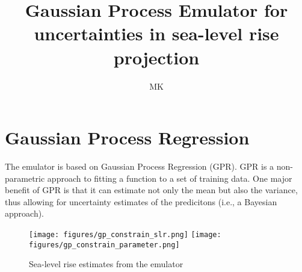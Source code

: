 \documentclass[12pt,a4paper]{article}
\author{MK}
\title{Gaussian Process Emulator for uncertainties in sea-level rise projection}
\begin{document}
\maketitle

\section{Gaussian Process Regression}

The emulator is based on Gaussian Process Regression (GPR).
GPR is a non-parametric approach to fitting a function to a set of training data.
One major benefit of GPR is that it can estimate not only the mean but also the variance, thus allowing for uncertainty estimates of the predicitons (i.e., a Bayesian approach).
 

\begin{figure}[hbtp]
\centering
\texttt{[image: figures/gp\_constrain\_slr.png]}
\texttt{[image: figures/gp\_constrain\_parameter.png]}
\caption{Sea-level rise estimates from the emulator}
\end{figure}
\end{document}
